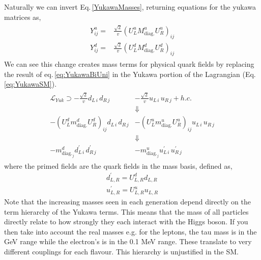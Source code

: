 %
%
Naturally we can invert Eq.\,\ref{YukawaMasses}, returning equations for the yukawa matrices as, 
\begin{align}
\label{eq:YukawaBiUni}
\begin{split}
Y^u_{ij} = & \frac{\sqrt{2}}{v} (U_L^u M^u_{\text{diag.}} U_R^u)_{ij} \\
Y^d_{ij} = & \frac{\sqrt{2}}{v} (U_L^d M^d_{\text{diag.}} U_R^d)_{ij}
\end{split}
\end{align}
%
We can see this change creates mass terms for physical quark fields by replacing the result of eq.\,\ref{eq:YukawaBiUni} in the Yukawa portion of the Lagrangian (Eq.\,\ref{eq:YukawaSM}).
%
\begin{align}
\begin{split}
\mathcal{L}_{Yuk} \supset -\frac{\sqrt{2}}{v} d_{L\,i} \, d_{R\,j} & - \frac{\sqrt{2}}{v} u_{L\,i} \, u_{R\,j} + h.c. \\ 
 & \Downarrow  \\
-(U_L^d m^d_{\text{diag.}} U_R^d)_{ij} d_{L\,i} \, d_{R\,j}  &- (U_L^u m^u_{\text{diag.}} U_R^u)_{ij} u_{L\,i} \, u_{R\,j} \\ 
& \Downarrow \\ 
-m^d_{\text{diag.}_j} d_{L\,i}^\prime \, d_{R\,j}^\prime & - m^u_{\text{diag.}_j} u_{L\,i}^\prime \, u_{R\,j}^\prime
\end{split}
\end{align}
%
where the primed fields are the quark fields in the mass basis, defined as, 
\begin{equation}
\begin{split}
d^\prime_{L,R} = U^d_{L,R} d_{L,R} \\
u^\prime_{L,R} = U^u_{L,R} u_{L,R} 
\end{split}  
\end{equation}
% 
Note that the increasing masses seen in each generation depend directly on the term hierarchy of the Yukawa terms. This means that the mass of all particles directly relate to how strongly they each interact with the Higgs boson.
%
If you then take into account the real masses e.g. for the leptons, the tau mass is in the GeV range while the electron's is in the 0.1 MeV range. These translate to very different couplings for each flavour. 
%
This hierarchy is unjustified in the SM. 

